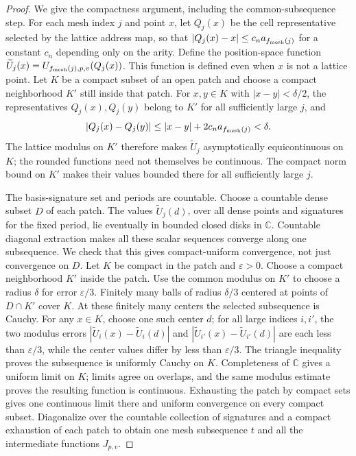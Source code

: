 \begin{proof}
We give the compactness argument, including the common-subsequence step.
For each mesh index $j$ and point $x$, let $Q_j(x)$ be the cell representative
selected by the lattice address map, so that $|Q_j(x)-x|\le c_n a_{f_{\rm
mesh}(j)}$ for a constant $c_n$ depending only on the arity. Define the
position-space function $\widetilde U_j(x)=U_{f_{\rm mesh}(j),p,v}(Q_j(x))$.
This function is defined even when $x$ is not a lattice point. Let $K$ be a
compact subset of an open patch and choose a compact neighborhood $K'$ still
inside that patch. For $x,y\in K$ with $|x-y|<\delta/2$, the representatives
$Q_j(x),Q_j(y)$ belong to $K'$ for all sufficiently large $j$, and
\[
 |Q_j(x)-Q_j(y)|\le |x-y|+2c_n a_{f_{\rm mesh}(j)}<\delta.
\]
The lattice modulus on $K'$ therefore makes $\widetilde U_j$ asymptotically equicontinuous on $K$; the rounded
functions need not themselves be continuous. The compact norm bound on $K'$ makes their values bounded there for all
sufficiently large $j$.

The basis-signature set and periods are countable. Choose a countable dense
subset $D$ of each patch. The values $\widetilde U_j(d)$, over all dense points and
signatures for the fixed period, lie eventually in bounded closed disks in
$\mathbb C$. Countable diagonal extraction \cite[Theorem~7.23]{RudinPMA} makes all these scalar sequences converge along one subsequence.
We check that this gives compact-uniform convergence, not just convergence on
$D$. Let $K$ be compact in the patch and $\varepsilon>0$. Choose a compact
neighborhood $K'$ inside the patch. Use the common modulus on $K'$ to choose a
radius $\delta$ for error $\varepsilon/3$. Finitely many balls of radius
$\delta/3$ centered at points of $D\cap K'$ cover $K$. At these finitely many
centers the selected subsequence is Cauchy. For any $x\in K$, choose one such
center $d$; for all large indices $i,i'$, the two modulus errors
$|\widetilde U_i(x)-\widetilde U_i(d)|$ and
$|\widetilde U_{i'}(x)-\widetilde U_{i'}(d)|$ are each less than
$\varepsilon/3$, while the center values differ by less than
$\varepsilon/3$. The triangle inequality proves the subsequence is uniformly
Cauchy on $K$. Completeness of $\mathbb C$ gives a uniform limit on $K$; limits
agree on overlaps, and the same modulus estimate proves the resulting
function is continuous. Exhausting the patch by compact sets gives one
continuous limit there and uniform convergence on every compact subset.
Diagonalize over the countable collection of signatures and a compact
exhaustion of each patch to obtain one mesh subsequence $t$ and all the
intermediate functions $J_{p,v}$.


\end{proof}

